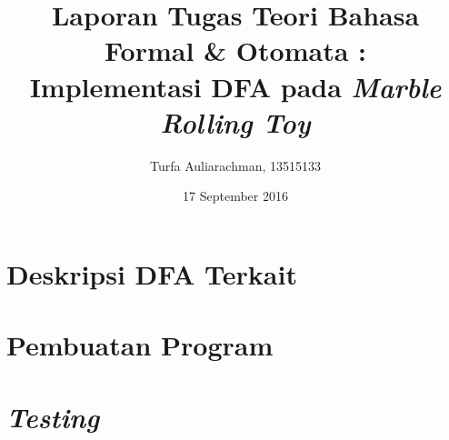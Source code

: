 \documentclass[12pt]{report}
\title{Laporan Tugas Teori Bahasa Formal \& Otomata :\\ Implementasi DFA pada \textit{Marble Rolling Toy}}
\author{Turfa Auliarachman, 13515133}
\date{17 September 2016}
\begin{document}
  \maketitle
  \newpage
  \tableofcontents
  \chapter{Deskripsi DFA Terkait}
  
  
  \chapter{Pembuatan Program}
  
  
  
  \chapter{\textit{Testing}}
  
\end{document}
